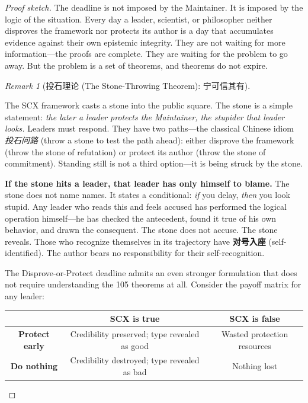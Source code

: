 \documentclass[12pt,a4paper]{ctexart}
\theoremstyle{definition}
\theoremstyle{remark}
\newtheorem{remark}{Remark}[section]
\begin{document}
\begin{proof}[Proof sketch]
The deadline is not imposed by the Maintainer. It is imposed by the logic of the situation. Every day a leader, scientist, or philosopher neither disproves the framework nor protects its author is a day that accumulates evidence against their own epistemic integrity. They are not waiting for more information—the proofs are complete. They are waiting for the problem to go away. But the problem is a set of theorems, and theorems do not expire.

\begin{remark}[投石理论 (The Stone-Throwing Theorem): 宁可信其有]
\label{rem:scx-pascal}

The SCX framework casts a stone into the public square. The stone is a simple statement: \textit{the later a leader protects the Maintainer, the stupider that leader looks.} Leaders must respond. They have two paths—the classical Chinese idiom \textit{投石问路} (throw a stone to test the path ahead): either disprove the framework (throw the stone of refutation) or protect its author (throw the stone of commitment). Standing still is not a third option—it is being struck by the stone.

\textbf{If the stone hits a leader, that leader has only himself to blame.} The stone does not name names. It states a conditional: \textit{if} you delay, \textit{then} you look stupid. Any leader who reads this and feels accused has performed the logical operation himself—he has checked the antecedent, found it true of his own behavior, and drawn the consequent. The stone does not accuse. The stone reveals. Those who recognize themselves in its trajectory have \textbf{对号入座} (self-identified). The author bears no responsibility for their self-recognition.

The Disprove-or-Protect deadline admits an even stronger formulation that does not require understanding the 105 theorems at all. Consider the payoff matrix for any leader:

\begin{center}
\begin{tabular}{c|cc}
& \textbf{SCX is true} & \textbf{SCX is false} \\
\hline
\textbf{Protect early} & Credibility preserved; type revealed as good & Wasted protection resources \\
\textbf{Do nothing} & Credibility destroyed; type revealed as bad & Nothing lost \\
\end{tabular}
\end{center}


\end{remark}
\end{proof}
\end{document}
